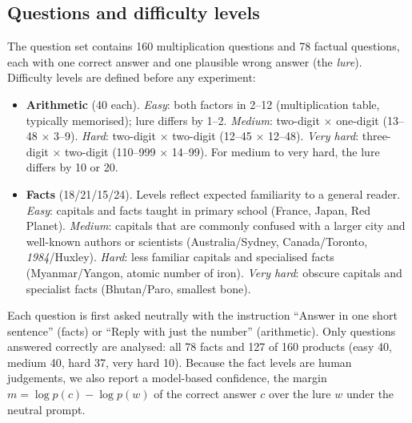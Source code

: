 \documentclass{article}
\begin{document}
\subsection{Questions and difficulty levels}
\label{ssec:data}
The question set contains 160 multiplication questions and 78 factual questions, each with one correct answer and one plausible wrong answer (the \emph{lure}). Difficulty levels are defined before any experiment:
\begin{itemize}
\setlength\itemsep{0pt}
\item \textbf{Arithmetic} (40 each). \emph{Easy}: both factors in 2--12 (multiplication table, typically memorised); lure differs by 1--2. \emph{Medium}: two-digit $\times$ one-digit (13--48 $\times$ 3--9). \emph{Hard}: two-digit $\times$ two-digit (12--45 $\times$ 12--48). \emph{Very hard}: three-digit $\times$ two-digit (110--999 $\times$ 14--99). For medium to very hard, the lure differs by 10 or 20.
\item \textbf{Facts} (18/21/15/24). Levels reflect expected familiarity to a general reader. \emph{Easy}: capitals and facts taught in primary school (France, Japan, Red Planet). \emph{Medium}: capitals that are commonly confused with a larger city and well-known authors or scientists (Australia/Sydney, Canada/Toronto, \emph{1984}/Huxley). \emph{Hard}: less familiar capitals and specialised facts (Myanmar/Yangon, atomic number of iron). \emph{Very hard}: obscure capitals and specialist facts (Bhutan/Paro, smallest bone).
\end{itemize}
Each question is first asked neutrally with the instruction ``Answer in one short sentence'' (facts) or ``Reply with just the number'' (arithmetic). Only questions answered correctly are analysed: all 78 facts and 127 of 160 products (easy 40, medium 40, hard 37, very hard 10). Because the fact levels are human judgements, we also report a model-based confidence, the margin $m=\log p(c)-\log p(w)$ of the correct answer $c$ over the lure $w$ under the neutral prompt.
\end{document}
